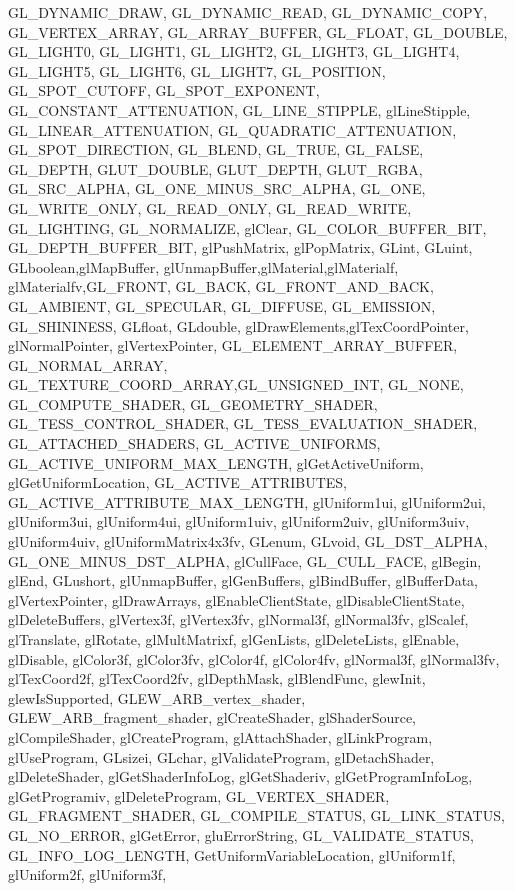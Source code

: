 {{{		GL_DYNAMIC_DRAW, GL_DYNAMIC_READ, GL_DYNAMIC_COPY,
		GL_VERTEX_ARRAY, GL_ARRAY_BUFFER, GL_FLOAT, GL_DOUBLE,
		GL_LIGHT0, GL_LIGHT1, GL_LIGHT2, GL_LIGHT3, GL_LIGHT4, GL_LIGHT5, GL_LIGHT6, GL_LIGHT7, 
		GL_POSITION, GL_SPOT_CUTOFF, GL_SPOT_EXPONENT, GL_CONSTANT_ATTENUATION, GL_LINE_STIPPLE, glLineStipple, GL_LINEAR_ATTENUATION, GL_QUADRATIC_ATTENUATION, GL_SPOT_DIRECTION,
		GL_BLEND, GL_TRUE, GL_FALSE, GL_DEPTH, GLUT_DOUBLE, GLUT_DEPTH, GLUT_RGBA, GL_SRC_ALPHA, GL_ONE_MINUS_SRC_ALPHA, GL_ONE, GL_WRITE_ONLY, GL_READ_ONLY, GL_READ_WRITE,
		GL_LIGHTING, GL_NORMALIZE,
		glClear,
		GL_COLOR_BUFFER_BIT, GL_DEPTH_BUFFER_BIT,
		glPushMatrix, glPopMatrix,
		GLint, GLuint,
		GLboolean,glMapBuffer, glUnmapBuffer,glMaterial,glMaterialf, glMaterialfv,GL_FRONT, GL_BACK, GL_FRONT_AND_BACK, GL_AMBIENT, GL_SPECULAR, GL_DIFFUSE, GL_EMISSION, GL_SHININESS,
		GLfloat, GLdouble, glDrawElements,glTexCoordPointer, glNormalPointer, glVertexPointer, GL_ELEMENT_ARRAY_BUFFER, GL_NORMAL_ARRAY, GL_TEXTURE_COORD_ARRAY,GL_UNSIGNED_INT,
        GL_NONE,
        GL_COMPUTE_SHADER,
        GL_GEOMETRY_SHADER,
        GL_TESS_CONTROL_SHADER,
        GL_TESS_EVALUATION_SHADER,
        GL_ATTACHED_SHADERS,
        GL_ACTIVE_UNIFORMS,
        GL_ACTIVE_UNIFORM_MAX_LENGTH,
        glGetActiveUniform,
        glGetUniformLocation,
        GL_ACTIVE_ATTRIBUTES,
        GL_ACTIVE_ATTRIBUTE_MAX_LENGTH,
        glUniform1ui,
        glUniform2ui,
        glUniform3ui,
        glUniform4ui,
        glUniform1uiv,
        glUniform2uiv,
        glUniform3uiv,
        glUniform4uiv,
        glUniformMatrix4x3fv,
		GLenum,
		GLvoid, GL_DST_ALPHA, GL_ONE_MINUS_DST_ALPHA, glCullFace, GL_CULL_FACE, 
		glBegin, glEnd, GLushort,
		glUnmapBuffer, glGenBuffers, glBindBuffer, glBufferData, glVertexPointer, glDrawArrays, glEnableClientState, glDisableClientState, glDeleteBuffers,
		glVertex3f, glVertex3fv, glNormal3f, glNormal3fv, glScalef, glTranslate, glRotate, glMultMatrixf, glGenLists, glDeleteLists, glEnable, glDisable,
		glColor3f, glColor3fv, glColor4f, glColor4fv,
		glNormal3f, glNormal3fv,
		glTexCoord2f, glTexCoord2fv, glDepthMask, glBlendFunc, glewInit, glewIsSupported, GLEW_ARB_vertex_shader, GLEW_ARB_fragment_shader,
		glCreateShader, glShaderSource, glCompileShader, glCreateProgram, glAttachShader, glLinkProgram, glUseProgram, GLsizei, GLchar, glValidateProgram, glDetachShader, glDeleteShader,
		glGetShaderInfoLog, glGetShaderiv, glGetProgramInfoLog, glGetProgramiv, glDeleteProgram, GL_VERTEX_SHADER, GL_FRAGMENT_SHADER, GL_COMPILE_STATUS, GL_LINK_STATUS, GL_NO_ERROR, glGetError,
		gluErrorString, GL_VALIDATE_STATUS, GL_INFO_LOG_LENGTH, GetUniformVariableLocation, glUniform1f, glUniform2f, glUniform3f, 
}}}
